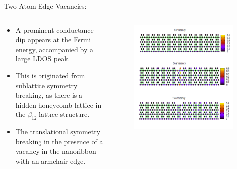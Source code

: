\documentclass[handout,t]{beamer}
\begin{document}
\begin{frame}{Two-Atom Edge Vacancies:}
	\begin{columns}[t]
		\begin{column}[t]{0.5\linewidth}
			\begin{itemize}
				\item A prominent conductance dip appears at the Fermi energy, accompanied by a large LDOS peak.
				\item This is originated from sublattice symmetry breaking, as there is a hidden honeycomb lattice in the $\beta_{12}$ lattice structure.
				\item  The translational symmetry breaking in the presence of a vacancy in the nanoribbon with an armchair edge. 
			\end{itemize}
		\end{column}
		\begin{column}[t]{0.5\linewidth}
			\begin{figure}[!ht]
				\centering
				\includegraphics[width=\linewidth]{../figures/Slide5.PNG}
				\label{armVSLDOS}
			\end{figure}
		\end{column}
	\end{columns}
\end{frame}
\end{document}
